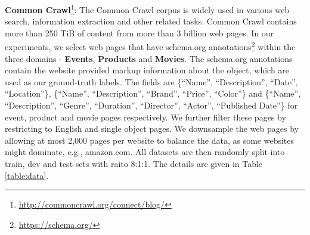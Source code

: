 \documentclass[sigconf]{acmart}
\begin{document}
\noindent\textbf{Common Crawl}\footnote{\url{http://commoncrawl.org/connect/blog/}}: The Common Crawl corpus is widely used in various web search, information extraction and other related tasks. Common Crawl contains more than 250 TiB of content from more than 3 billion web pages. In our experiments, we select web pages that have schema.org annotations\footnote{\url{https://schema.org/}} within the three domains - \textbf{Events}, \textbf{Products} and \textbf{Movies}. The schema.org annotations contain the website provided markup information about the object, which are used as our ground-truth labels. The fields are \{``Name'', ``Description'', ``Date'', ``Location''\}, \{``Name'', ``Description'', ``Brand'', ``Price'', ``Color''\} and \{``Name'', ``Description'', ``Genre'', ``Duration'', ``Director'', ``Actor'', ``Published Date''\} for event, product and movie pages respectively. We further filter these pages by restricting to English and single object pages. We downsample the web pages by allowing at most 2,000 pages per website to balance the data, as some websites might dominate, e.g., amazon.com. All datasets are then randomly split into train, dev and test sets with raito 8:1:1. The details are given in Table \ref{table:data}.
\end{document}
